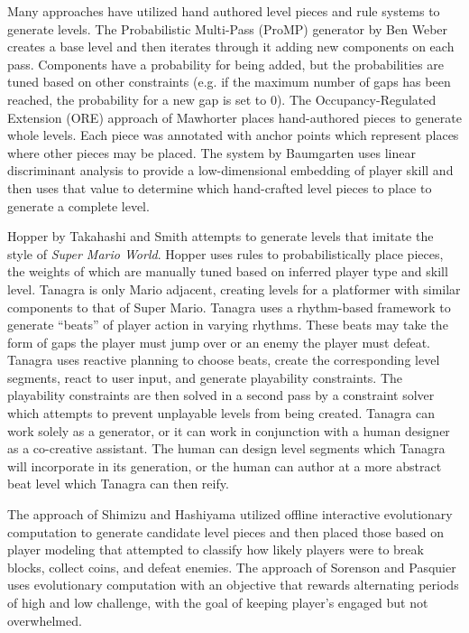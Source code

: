 \documentclass[a4paper]{article}
\begin{document}
Many approaches have utilized hand authored level pieces and rule systems to generate levels. The Probabilistic Multi-Pass (ProMP) generator by Ben Weber \cite{mario2010} creates a base level and then iterates through it adding new components on each pass.  Components have a probability for being added, but the probabilities are tuned based on other constraints (e.g. if the maximum number of gaps has been reached, the probability for a new gap is set to 0).  The Occupancy-Regulated Extension (ORE) approach of Mawhorter \cite{mawhorterORE} places hand-authored pieces to generate whole levels.  Each piece was annotated with anchor points which represent places where other pieces may be placed.   The system by Baumgarten \cite{mario2010} uses linear discriminant analysis to provide a low-dimensional embedding of player skill and then uses that value to determine which hand-crafted level pieces to place to generate a complete level. 

Hopper by Takahashi and Smith \cite{mario2010} attempts to generate levels that imitate the style of \textit{Super Mario World}.  Hopper uses rules to probabilistically place pieces, the weights of which are manually tuned based on inferred player type and skill level. Tanagra \cite{tanagra} is only Mario adjacent, creating levels for a platformer with similar components to that of Super Mario.  Tanagra uses a rhythm-based framework to generate ``beats'' of player action in varying rhythms.  These beats may take the form of gaps the player must jump over or an enemy the player must defeat.   Tanagra uses reactive planning to choose beats, create the corresponding level segments, react to user input, and generate playability constraints.  The playability constraints are then solved in a second pass by a constraint solver which attempts to prevent unplayable levels from being created.  Tanagra can work solely as a generator, or it can work in conjunction with a human designer as a co-creative assistant.  The human can design level segments which Tanagra will incorporate in its generation, or the human can author at a more abstract beat level which Tanagra can then reify.

The approach of Shimizu and Hashiyama \cite{mario2010} utilized offline interactive evolutionary computation to generate candidate level pieces and then placed those based on player modeling that attempted to classify how likely players were to break blocks, collect coins, and defeat enemies.  The approach of Sorenson and Pasquier \cite{sorpasq} uses evolutionary computation with an objective that rewards alternating periods of high and low challenge, with the goal of keeping player's engaged but not overwhelmed.  
\end{document}
